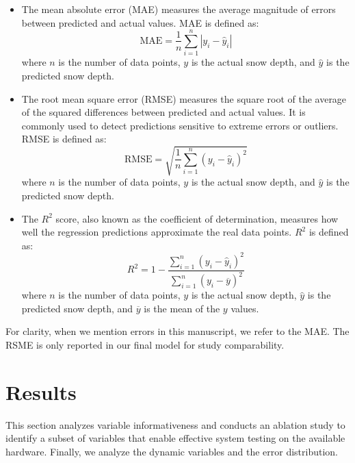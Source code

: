 \documentclass[preprint,12pt]{elsarticle}
\begin{document}
\begin{itemize}
    \item The mean absolute error (MAE) measures the average magnitude of errors between predicted and actual values. MAE is defined as:
    \begin{equation}
    \text{MAE} = \frac{1}{n} \sum_{i=1}^{n} |y_i - \hat{y}_i|
    \end{equation}
    \noindent where $n$ is the number of data points, $y$ is the actual snow depth, and $\hat{y}$ is the predicted snow depth.

    \item The root mean square error (RMSE) measures the square root of the average of the squared differences between predicted and actual values. It is commonly used to detect predictions sensitive to extreme errors or outliers. RMSE is defined as:
    \begin{equation}
    \text{RMSE} = \sqrt{\frac{1}{n} \sum_{i=1}^{n} (y_i - \hat{y}_i)^2}
    \end{equation}
     \noindent where $n$ is the number of data points, $y$ is the actual snow depth, and $\hat{y}$ is the predicted snow depth.
    \item The $R^2$ score, also known as the coefficient of determination, measures how well the regression predictions approximate the real data points. $R^2$ is defined as:
    \begin{equation}
        R^2 = 1 - \frac{\sum_{i=1}^n (y_i - \hat{y}_i)^2}{\sum_{i=1}^n (y_i - \overline{y})^2}
    \end{equation}
    \noindent where $n$ is the number of data points, $y$ is the actual snow depth, $\hat{y}$ is the predicted snow depth, and $\overline{y}$ is the mean of the $y$ values. 
\end{itemize}

For clarity, when we mention errors in this manuscript, we refer to the MAE. The RSME is only reported in our final model for study comparability.

\section{Results} \label{Sec:Results}

This section analyzes variable informativeness and conducts an ablation study to identify a subset of variables that enable effective system testing on the available hardware. Finally, we analyze the dynamic variables and the error distribution.
\end{document}
